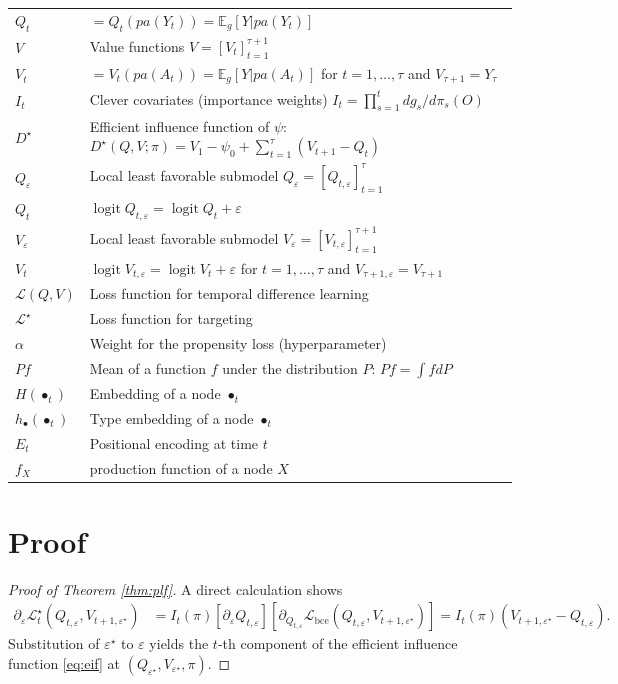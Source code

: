 \documentclass{article}
\DeclareMathOperator{\logit}{logit}
\theoremstyle{plain}
\theoremstyle{definition}
\theoremstyle{remark}
\begin{document}
\begin{center}
\begin{tabular}{ll}
     $Q_t$ & $=Q_t(pa(Y_t))=\mathbb{E}_g[Y|pa(Y_t)]$ \\
     $V$ & Value functions $V=[V_t]_{t=1}^{\tau+1}$ \\
     $V_t$ & $=V_t(pa(A_t))=\mathbb{E}_g[Y|pa(A_t)]$ for $t=1,\ldots,\tau$ and $V_{\tau+1}=Y_\tau$\\
     $I_t$ & Clever covariates (importance weights) $I_t=\prod_{s=1}^t dg_s/d\pi_s(O)$ \\
     $D^\star$ & Efficient influence function of $\psi$: $D^\star(Q, V; \pi) = V_1 - \psi_0 + \sum_{t=1}^\tau (V_{t+1} - Q_t)$ \\
     $Q_\varepsilon$ & Local least favorable submodel $Q_\varepsilon=[Q_{t,\varepsilon}]_{t=1}^\tau$ \\
     $Q_t$ & $\logit Q_{t,\varepsilon} = \logit Q_t +\varepsilon$ \\
     $V_\varepsilon$ & Local least favorable submodel $V_\varepsilon=[V_{t,\varepsilon}]_{t=1}^{\tau+1}$  \\
     $V_t$ & $\logit V_{t,\varepsilon} = \logit V_t +\varepsilon$ for $t=1,\ldots,\tau$ and $V_{\tau+1,\varepsilon}=V_{\tau+1}$ \\
     $\mathcal{L}(Q, V)$ & Loss function for temporal difference learning \\
     $\mathcal{L^\star}$ & Loss function for targeting \\
     $\alpha$ & Weight for the propensity loss (hyperparameter) \\
     $Pf$ & Mean of a function $f$ under the distribution $P$: $Pf=\int fdP$ \\
     $H(\bullet_t)$ & Embedding of a node $\bullet_t$\\
     $h_\bullet(\bullet_t)$ & Type embedding of a node $\bullet_t$\\
     $E_t$ & Positional encoding at time $t$ \\
     $f_X$ & production function of a node $X$
     
\end{tabular}
    
\end{center}

\section{Proof}

\label{sec:proof}

\begin{proof}[Proof of Theorem \ref{thm:plf}]
    A direct calculation shows
    \begin{align*}
        \partial_\varepsilon \mathcal{L}^\star_t(Q_{t,\varepsilon}, V_{t+1,\varepsilon^\star})
        &= I_t(\pi)[\partial_\varepsilon Q_{t,\varepsilon}] [\partial_{Q_{t,\varepsilon}}\mathcal{L}_{\mathrm{bce}}(Q_{t,\varepsilon}, V_{t+1,\varepsilon^\star})] = I_{t}(\pi)(V_{t+1,\varepsilon^\star} - Q_{t,\varepsilon}).
    \end{align*}
    Substitution of $\varepsilon^\star$ to $\varepsilon$ yields the $t$-th component of the efficient influence function \eqref{eq:eif} at $(Q_{\varepsilon^\star}, V_{\varepsilon^\star}, \pi)$.
\end{proof}
\end{document}
